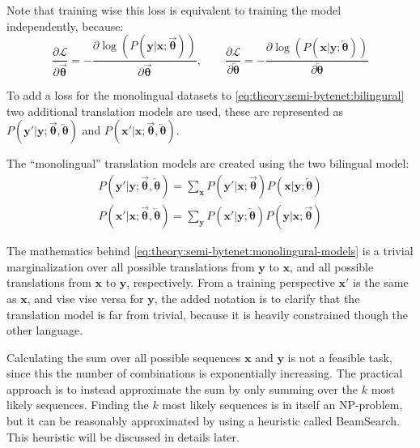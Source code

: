 Note that training wise this loss is equivalent to training the model independently, because:
\begin{equation}
\frac{\partial \mathcal{L}}{\partial \overrightarrow{\boldsymbol\theta}} = -\frac{\partial \log(P(\mathbf{y}|\mathbf{x};\overrightarrow{\boldsymbol\theta}))}{\partial \overrightarrow{\boldsymbol\theta}}, \qquad \frac{\partial \mathcal{L}}{\partial \overleftarrow{\boldsymbol\theta}} = -\frac{\partial \log(P(\mathbf{x}|\mathbf{y};\overleftarrow{\boldsymbol\theta}))}{\partial \overleftarrow{\boldsymbol\theta}}
\end{equation}

To add a loss for the monolingual datasets to \eqref{eq:theory:semi-bytenet:bilingural} two additional translation models are used, these are represented as $P(\mathbf{y'}|\mathbf{y};\overrightarrow{\boldsymbol\theta},\overleftarrow{\boldsymbol\theta})$ and $P(\mathbf{x'}|\mathbf{x};\overrightarrow{\boldsymbol\theta},\overleftarrow{\boldsymbol\theta})$.

The ``monolingual'' translation models are created using the two bilingual model:
\begin{equation}
\begin{aligned}
P(\mathbf{y'}|\mathbf{y};\overrightarrow{\boldsymbol\theta},\overleftarrow{\boldsymbol\theta}) = \sum_\mathbf{x} P(\mathbf{y'}|\mathbf{x};\overrightarrow{\boldsymbol\theta}) P(\mathbf{x}|\mathbf{y};\overleftarrow{\boldsymbol\theta}) \\
P(\mathbf{x'}|\mathbf{x};\overrightarrow{\boldsymbol\theta},\overleftarrow{\boldsymbol\theta}) = \sum_\mathbf{y} P(\mathbf{x'}|\mathbf{y};\overleftarrow{\boldsymbol\theta}) P(\mathbf{y}|\mathbf{x};\overrightarrow{\boldsymbol\theta})
\end{aligned}
\label{eq:theory:semi-bytenet:monolingural-models}
\end{equation}

The mathematics behind \eqref{eq:theory:semi-bytenet:monolingural-models} is a trivial marginalization over all possible translations from $\mathbf{y}$ to $\mathbf{x}$, and all possible translations from $\mathbf{x}$ to $\mathbf{y}$, respectively. From a training perspective $\mathbf{x'}$ is the same as $\mathbf{x}$, and vise vise versa for $\mathbf{y}$, the added notation is to clarify that the translation model is far from trivial, because it is heavily constrained though the other language.

Calculating the sum over all possible sequences $\mathbf{x}$ and $\mathbf{y}$ is not a feasible task, since this the number of combinations is exponentially increasing. The practical approach is to instead approximate the sum by only summing over the $k$ most likely sequences. Finding the $k$ most likely sequences is in itself an NP-problem, but it can be reasonably approximated by using a heuristic called BeamSearch. This heuristic will be discussed in details later.

